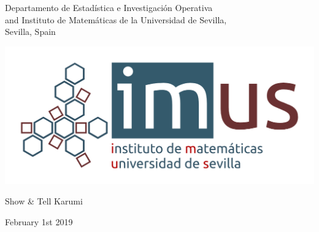\documentclass[11pt,a4paper,xcolor=dvipsnames, leqno]{beamer}
\begin{document}
\begingroup 
    \begin{frame}
        \titlepage
\begin{center}
\insertauthor\par
\end{center}
\begin{center}
        \scriptsize Departamento de Estad\'istica e Investigaci\'on Operativa\\ and Instituto de Matem\'aticas de la Universidad de Sevilla,\\
        Sevilla, Spain
        \end{center}
\begin{center}
\LARGE {}
\end{center}
\begin{center}
\includegraphics[scale=0.35]{imus_basico_oct.png}
\end{center}
\begin{center}
\footnotesize{Show \& Tell Karumi}
\end{center}
\begin{center}
\footnotesize{February 1st 2019}
\end{center}
\end{frame}
\endgroup
\end{document}
